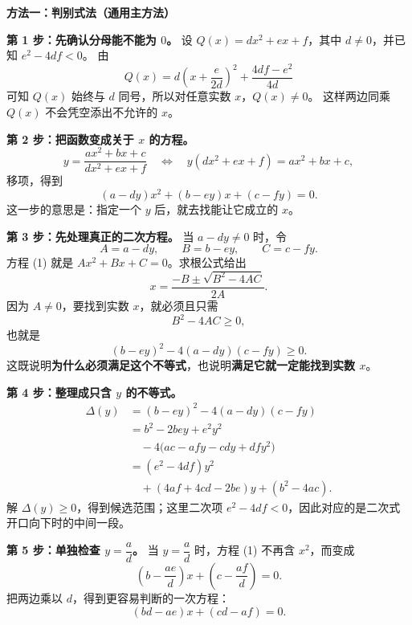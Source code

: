 \clearpage
\begin{proofbox}
  \textbf{\textcolor{CProof}{方法一：判别式法（通用主方法）}}
\begin{center}\end{center}


  \medskip
  \textbf{第 1 步：先确认分母能不能为 $0$。}
  设 $Q(x)=dx^2+ex+f$，其中 $d\ne0$，并已知 $e^2-4df<0$。
  由
  \[
    Q(x)=d\left(x+\frac{e}{2d}\right)^2+\frac{4df-e^2}{4d}
  \]
  可知 $Q(x)$ 始终与 $d$ 同号，所以对任意实数 $x$，$Q(x)\ne0$。
  这样两边同乘 $Q(x)$ 不会凭空添出不允许的 $x$。

  \medskip
  \textbf{第 2 步：把函数变成关于 $x$ 的方程。}
  \[
    y=\frac{ax^2+bx+c}{dx^2+ex+f}
    \quad\Longleftrightarrow\quad
    y(dx^2+ex+f)=ax^2+bx+c,
  \]
  移项，得到
  \[
    \boxed{(a-dy)x^2+(b-ey)x+(c-fy)=0.}\tag{1}
  \]
  这一步的意思是：指定一个 $y$ 后，就去找能让它成立的 $x$。

  \medskip
  \textbf{第 3 步：先处理真正的二次方程。}
  当 $a-dy\ne0$ 时，令
  \[
    A=a-dy,\qquad B=b-ey,\qquad C=c-fy.
  \]
  方程 (1) 就是 $Ax^2+Bx+C=0$。求根公式给出
  \[
    x=\frac{-B\pm\sqrt{B^2-4AC}}{2A}.
  \]
  因为 $A\ne0$，要找到实数 $x$，就必须且只需
  \[
    B^2-4AC\ge0,
  \]
  也就是
  \[
    \boxed{(b-ey)^2-4(a-dy)(c-fy)\ge0.}\tag{2}
  \]
  这既说明\textbf{为什么必须满足这个不等式}，也说明\textbf{满足它就一定能找到实数 $x$}。

  \medskip
  \textbf{第 4 步：整理成只含 $y$ 的不等式。}
  \[
    \begin{aligned}
      \Delta(y)
      &=(b-ey)^2-4(a-dy)(c-fy)\\
      &=b^2-2bey+e^2y^2\\
      &\quad-4\bigl(ac-afy-cdy+dfy^2\bigr)\\
      &=(e^2-4df)y^2\\
      &\quad+(4af+4cd-2be)y+(b^2-4ac).
    \end{aligned}
  \]
  解 $\Delta(y)\ge0$，得到候选范围；这里二次项 $e^2-4df<0$，因此对应的是二次式开口向下时的中间一段。

  \medskip
  \textbf{第 5 步：单独检查 $y=\dfrac ad$。}
  当 $y=\dfrac ad$ 时，方程 (1) 不再含 $x^2$，而变成
  \[
    \left(b-\frac{ae}{d}\right)x+\left(c-\frac{af}{d}\right)=0.
  \]
  把两边乘以 $d$，得到更容易判断的一次方程：
  \[
    \boxed{(bd-ae)x+(cd-af)=0.}\tag{3}
  \]
\end{proofbox}
\clearpage
